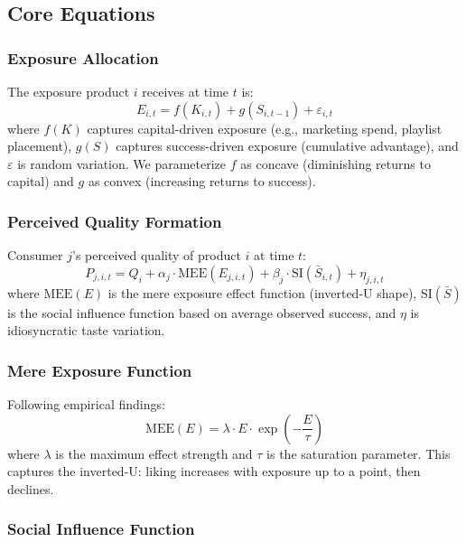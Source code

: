 \documentclass[11pt,a4paper]{article}
\begin{document}
\subsection{Core Equations}

\subsubsection{Exposure Allocation}

The exposure product $i$ receives at time $t$ is:
\begin{equation}
E_{i,t} = f(K_{i,t}) + g(S_{i,t-1}) + \varepsilon_{i,t}
\label{eq:exposure}
\end{equation}
where $f(K)$ captures capital-driven exposure (e.g., marketing spend, playlist placement), $g(S)$ captures success-driven exposure (cumulative advantage), and $\varepsilon$ is random variation. We parameterize $f$ as concave (diminishing returns to capital) and $g$ as convex (increasing returns to success).

\subsubsection{Perceived Quality Formation}

Consumer $j$'s perceived quality of product $i$ at time $t$:
\begin{equation}
P_{j,i,t} = Q_i + \alpha_j \cdot \text{MEE}(E_{j,i,t}) + \beta_j \cdot \text{SI}(\bar{S}_{i,t}) + \eta_{j,i,t}
\label{eq:perceived}
\end{equation}
where $\text{MEE}(E)$ is the mere exposure effect function (inverted-U shape), $\text{SI}(\bar{S})$ is the social influence function based on average observed success, and $\eta$ is idiosyncratic taste variation.

\subsubsection{Mere Exposure Function}

Following empirical findings:
\begin{equation}
\text{MEE}(E) = \lambda \cdot E \cdot \exp\left(-\frac{E}{\tau}\right)
\label{eq:mee}
\end{equation}
where $\lambda$ is the maximum effect strength and $\tau$ is the saturation parameter. This captures the inverted-U: liking increases with exposure up to a point, then declines.

\subsubsection{Social Influence Function}
\end{document}
